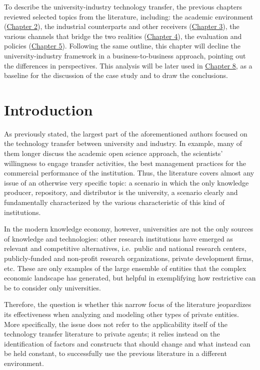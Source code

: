

\label{Chapter6}

To describe the university-industry technology transfer, the previous chapters reviewed selected topics from the literature, including: the academic environment (\hyperref[Chapter2]{Chapter 2}), the industrial counterparts and other receivers (\hyperref[Chapter3]{Chapter 3}), the various channels that bridge the two realities (\hyperref[Chapter4]{Chapter 4}), the evaluation and policies (\hyperref[Chapter5]{Chapter 5}). Following the same outline, this chapter will decline the university-industry framework in a business-to-business approach, pointing out the differences in perspectives. This analysis will be later used in \hyperref[Chapter8]{Chapter 8}, as a baseline for the discussion of the case study and to draw the conclusions. 

\section{Introduction}

As previously stated, the largest part of the aforementioned authors focused on the technology transfer between university and industry. In example, many of them longer discuss the academic open science approach, the scientists' willingness to engage transfer activities, the best management practices for the commercial performance of the institution. Thus, the literature covers almost any issue of an otherwise very specific topic: a scenario in which the only knowledge producer, repository, and distributor is the university, a scenario clearly and fundamentally characterized by the various characteristic of this kind of institutions.

In the modern knowledge economy, however, universities are not the only sources of knowledge and technologies: other research institutions have emerged as relevant and competitive alternatives, i.e.\ public and national research centers, publicly-funded and non-profit research organizations, private development firms, etc. These are only examples of the large ensemble of entities that the complex economic landscape has generated, but helpful in exemplifying how restrictive can be to consider only universities.

Therefore, the question is whether this narrow focus of the literature jeopardizes its effectiveness when analyzing and modeling other types of private entities. More specifically, the issue does not refer to the applicability itself of the technology transfer literature to private agents; it relies instead on the identification of factors and constructs that should change and what instead can be held constant, to successfully use the previous literature in a different environment.

